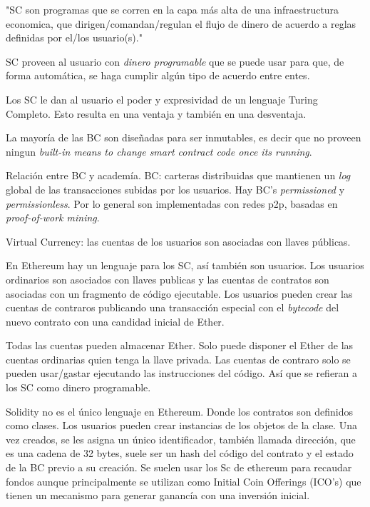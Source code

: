 

"SC son programas que se corren en la
capa más alta de una infraestructura
economica, que dirigen/comandan/regulan
el flujo de dinero de acuerdo a reglas
definidas por el/los usuario(s)."


SC proveen al usuario con {\it dinero programable}
que se puede usar para que, de forma automática,
se haga cumplir algún tipo de acuerdo entre entes.

Los SC le dan al usuario el poder y expresividad
de un lenguaje Turing Completo. Esto resulta
en una ventaja y también en una desventaja.

La mayoría de las BC son diseñadas para
ser inmutables, es decir que no proveen
ningun {\it built-in means to change smart contract code once its running}.

Relación entre BC y academía.
BC: carteras distribuidas que mantienen un {\it log} global de las
transacciones subidas por los usuarios. Hay BC's {\it permissioned}
y {\it permissionless}. Por lo general son implementadas con redes p2p,
basadas en {\it proof-of-work mining}.

Virtual Currency: las cuentas de los usuarios son asociadas con llaves públicas.

En Ethereum hay un lenguaje para los SC, así también son usuarios. Los usuarios
ordinarios son asociados con llaves publicas y las cuentas de contratos
son asociadas con un fragmento de código ejecutable. Los usuarios pueden
crear las cuentas de contraros publicando una transacción especial con
el {\it bytecode} del nuevo contrato con una candidad inicial de Ether.

Todas las cuentas pueden almacenar Ether. Solo puede disponer el Ether
de las cuentas ordinarias quien tenga la llave privada. Las cuentas
de contraro solo se pueden usar/gastar ejecutando las instrucciones del código.
Así que se refieran a los SC como dinero programable.

Solidity no es el único lenguaje en Ethereum. Donde los contratos son definidos como clases.
Los usuarios pueden crear instancias de los objetos de la clase. Una vez creados, se
les asigna un único identificador, también llamada dirección, que es una
cadena de 32 bytes, suele ser un hash del código del contrato y el estado de la BC
previo a su creación. 
Se suelen usar los Sc de ethereum para recaudar fondos aunque
principalmente se utilizan como Initial Coin Offerings (ICO's)
que tienen un mecanismo para generar ganancía con una inversión inicial. 


